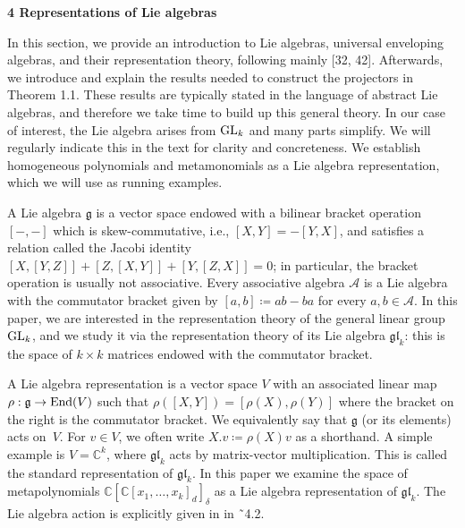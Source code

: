 \documentclass[10pt,a4paper]{article}
\begin{document}


\par\medskip\noindent\textbf{4 Representations of Lie algebras}\par




In this section, we provide an introduction to Lie algebras, universal enveloping algebras, and their representation theory, following mainly [32, 42].
Afterwards, we introduce and explain the results needed to construct the projectors in Theorem 1.1. These results are typically stated in the language of abstract Lie algebras, and therefore we take time to build up this general theory. In our case of interest, the Lie algebra arises from $\textnormal{GL}_{k}$ and many parts simplify.
We will regularly indicate this in the text for clarity and concreteness.
We establish homogeneous polynomials and metamonomials as a Lie algebra representation, which we will use as running examples.





A Lie algebra $\mathfrak{g}$ is a vector space endowed with a bilinear bracket operation $[-,-]$ which is skew-commutative, i.e., $[X,Y]=-[Y,X]$, and satisfies a relation called the Jacobi identity $[X,[Y,Z]]+[Z,[X,Y]]+[Y,[Z,X]]=0$; in particular, the bracket operation is usually not associative. Every associative algebra $\mathcal{A}$ is a Lie algebra with the commutator bracket given by $[a,b]\coloneqq ab-ba$ for every $a,b\in\mathcal{A}$. In this paper, we are interested in the representation theory of the general linear group $\textnormal{GL}_{k}$, and we study it via the representation theory of its Lie algebra $\mathfrak{gl}_{k}$: this is the space of $k\times k$ matrices endowed with the commutator bracket.





A Lie algebra representation is a vector space $V$ with an associated linear map $\rho:\mathfrak{g}\to\textnormal{End}(V)$ such that $\rho([X,Y])=[\rho(X),\rho(Y)]$ where the bracket on the right is the commutator bracket. We equivalently say that $\mathfrak{g}$ (or its elements) acts on $V$. For $v\in V$, we often write $X.v\coloneqq\rho(X)v$ as a shorthand.
A simple example is $V=\mathbb{C}^{k}$, where $\mathfrak{gl}_{k}$ acts by matrix-vector multiplication. This is called the standard representation of $\mathfrak{gl}_{k}$.
In this paper we examine the space of metapolynomials $\mathbb{C}[\mathbb{C}[x_{1},\ldots,x_{k}]_{d}]_{\delta}$ as a Lie algebra representation of $\mathfrak{gl}_{k}$. The Lie algebra action is explicitly given in in ˜4.2.
\end{document}
